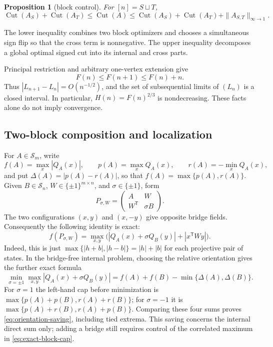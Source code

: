 \documentclass[11pt]{article}
\newtheorem{proposition}[theorem]{Proposition}
\theoremstyle{definition}
\theoremstyle{remark}
\newcommand{\Cut}{\operatorname{Cut}}
\begin{document}
\begin{proposition}[block control]\label{prop:block-control}
For $[n]=S\sqcup T$,
\[
 \Cut(A_S)+\Cut(A_T)\le\Cut(A)
 \le\Cut(A_S)+\Cut(A_T)+\|A_{S,T}\|_{\infty\to1}.
\]
\end{proposition}

The lower inequality combines two block optimizers and chooses a simultaneous
sign flip so that the cross term is nonnegative.  The upper inequality
decomposes a global optimal signed cut into its internal and cross parts.

Principal restriction and arbitrary one-vertex extension give
\[
 F(n)\le F(n+1)\le F(n)+n.
\]
Thus $|L_{n+1}-L_n|=O(n^{-1/2})$, and the set of subsequential limits of
$(L_n)$ is a closed interval.  In particular, $H(n)=F(n)^{2/3}$ is
nondecreasing.  These facts alone do not imply convergence.

\subsection{Two-block composition and localization}

For $A\in\mathcal S_m$, write
\[
 f(A)=\max_x|Q_A(x)|,\qquad
 p(A)=\max_xQ_A(x),\qquad r(A)=-\min_xQ_A(x),
\]
and put $\Delta(A)=|p(A)-r(A)|$, so that
$f(A)=\max\{p(A),r(A)\}$.  Given $B\in\mathcal S_n$,
$W\in\{\pm1\}^{m\times n}$, and $\sigma\in\{\pm1\}$, form
\[
 P_{\sigma,W}=\begin{pmatrix}A&W\\W^{\mathsf T}&\sigma B\end{pmatrix}.
\]
The two configurations $(x,y)$ and $(x,-y)$ give opposite bridge fields.
Consequently the following identity is exact:
\begin{equation}\label{eq:exact-block-cap}
 f(P_{\sigma,W})=
 \max_{x,y}\bigl(
 |Q_A(x)+\sigma Q_B(y)|+|x^{\mathsf T}Wy|
 \bigr).
\end{equation}
Indeed, this is just
$\max\{|h+b|,|h-b|\}=|h|+|b|$ for each projective pair of
states.  In the bridge-free internal problem, choosing the relative
orientation gives the further exact formula
\begin{equation}\label{eq:orientation-saving}
 \min_{\sigma=\pm1}\max_{x,y}|Q_A(x)+\sigma Q_B(y)|
 =f(A)+f(B)-\min\{\Delta(A),\Delta(B)\}.
\end{equation}
For $\sigma=1$ the left-hand cap before minimization is
$\max\{p(A)+p(B),r(A)+r(B)\}$; for $\sigma=-1$ it is
$\max\{p(A)+r(B),r(A)+p(B)\}$.  Comparing these four sums proves
\eqref{eq:orientation-saving}, including tied extrema.
This saving concerns the internal direct sum only; adding a bridge still
requires control of the correlated maximum in \eqref{eq:exact-block-cap}.
\end{document}
